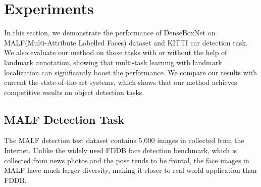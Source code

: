 
 
\section{Experiments}

In this section, we demonstrate the performance of DenseBoxNet on MALF(Multi-Attribute Labelled Faces) dataset\cite{faceevaluation15}  and KITTI\cite{Geiger2012CVPR} car detection task. We also evaluate our method on those tasks with or without the help of landmark annotation, showing that multi-task learning with landmark localization can significantly boost the performance. We compare our results with current the state-of-the-art systems, which shows that our method achieves competitive results on object detection tasks.  

\subsection{ MALF  Detection Task}
The MALF detection test dataset contains 5,000 images in collected from the Internet. Unlike the widely used FDDB\cite{jain2010fddb} face detection benchmark, which is collected from news photos and the pose tends to be frontal, the face images in MALF have much larger diversity, making it closer to real world application than FDDB. 

